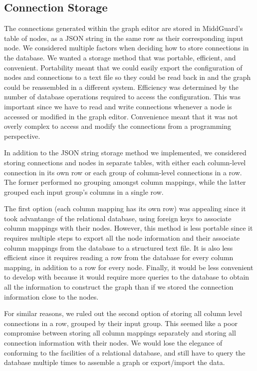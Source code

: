 \documentclass[midd]{thesis}
\begin{document}
\subsection{Connection Storage}

The connections generated within the graph editor are stored in MiddGuard's
table of nodes, as a JSON string in the same row as their corresponding input
node. We considered multiple factors when deciding how to store connections in
the database. We wanted a storage method that was portable, efficient, and
convenient. Portability meant that we could easily export the configuration of
nodes and connections to a text file so they could be read back in and the graph
could be reassembled in a different system. Efficiency was determined by the
number of database operations required to access the configuration. This was
important since we have to read and write connections whenever a node is
accessed or modified in the graph editor. Convenience meant that it was not
overly complex to access and modify the connections from a programming
perspective.

In addition to the JSON string storage method we implemented, we considered
storing connections and nodes in separate tables, with either each column-level
connection in its own row or each group of column-level connections in a row.
The former performed no grouping amongst column mappings, while the latter
grouped each input group's columns in a single row.

The first option (each column mapping has its own row) was appealing since it
took advantange of the relational database, using foreign keys to associate
column mappings with their nodes. However, this method is less portable since it
requires multiple steps to export all the node information and their associate
column mappings from the database to a structured text file. It is also less
efficient since it requires reading a row from the database for every column
mapping, in addition to a row for every node. Finally, it would be less
convenient to develop with because it would require more queries to the database
to obtain all the information to construct the graph than if we stored the
connection information close to the nodes.

For similar reasons, we ruled out the second option of storing all column level
connections in a row, grouped by their input group. This seemed like a poor
compromise between storing all column mappings separately and storing all
connection information with their nodes. We would lose the elegance of
conforming to the facilities of a relational database, and still have to query
the database multiple times to assemble a graph or export/import the data.
\end{document}
